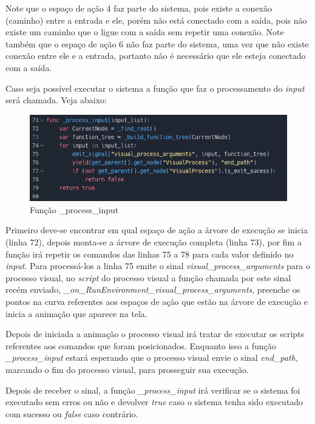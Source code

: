 Note que o espaço de ação 4 faz parte do sistema, pois existe a conexão 
(caminho) entre a entrada e ele, porém não está conectado com a saída, pois 
não existe um caminho que o ligue com a saída sem repetir uma conexão. Note
também que o espaço de ação 6 não faz parte do sistema, uma vez que não existe
conexão entre ele e a entrada, portanto não é necessário que ele esteja 
conectado com a saída.

Caso seja possível executar o sistema a função que faz o processamento do 
\textit{input} será chamada. Veja abaixo:

\begin{figure}[H]
    \includegraphics[width=\textwidth]{../figuras/process_input.png}
    \caption{Função \_process\_input}
\end{figure}

Primeiro deve-se encontrar em qual espaço de ação a árvore de execução se 
inicia (linha 72), depois monta-se a árvore de execução completa (linha 73),
por fim a função irá repetir os comandos das linhas 75 a 78 para cada valor
definido no \textit{input}. Para processá-los a linha 75 emite o sinal 
\textit{visual\_process\_arguments} para o processo visual, no \textit{script} 
do processo visual a função chamada por este sinal recém enviado,
\textit{\_on\_RunEnvironment\_visual\_process\_arguments}, preenche os pontos na
curva referentes aos espaços de ação que estão na árvore de execução e inicia a
animação que aparece na tela.

Depois de iniciada a animação o processo visual irá tratar de executar os 
scripts referentes aos comandos que foram posicionados. Enquanto isso a função 
\textit{\_process\_input} estará esperando que o processo visual envie o sinal 
\textit{end\_path}, marcando o fim do processo visual, para prosseguir sua 
execução.

Depois de receber o sinal, a função \textit{\_process\_input} irá verificar se 
o sistema foi executado sem erros ou não e devolver \textit{true} caso o 
sistema tenha sido executado com sucesso ou \textit{false} caso contrário.

